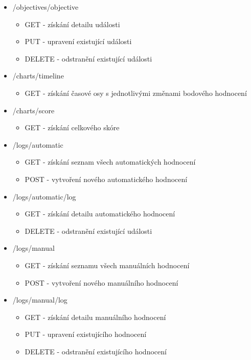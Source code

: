 \documentclass[
  digital, %
  twoside, %
  table,   %
  lof,     %
  lot,     %
]{fithesis3}
\begin{document}
\begin{itemize}
    \item /objectives/{objective}
    \begin{itemize}
        \item GET - získání detailu události
        \item PUT - upravení existující události
        \item DELETE - odstranění existující události
    \end{itemize}
        
    \item /charts/timeline
    \begin{itemize}
        \item GET - získání časové osy s jednotlivými změnami bodového hodnocení
    \end{itemize}
        
    \item /charts/score
    \begin{itemize}
        \item GET - získání celkového skóre
    \end{itemize}
        
    \item /logs/automatic
    \begin{itemize}
        \item GET - získání seznam všech automatických hodnocení
        \item POST -  vytvoření nového automatického hodnocení
    \end{itemize}
        
    \item /logs/automatic/{log}
    \begin{itemize}
        \item GET - získání detailu automatického hodnocení
        \item DELETE - odstranění existující události
    \end{itemize}
            
    \item /logs/manual
    \begin{itemize}
        \item GET - získání seznamu všech manuálních hodnocení
        \item POST -  vytvoření nového manuálního hodnocení
    \end{itemize}
            
    \item /logs/manual/{log}
    \begin{itemize}
        \item GET - získání detailu manuálního hodnocení
        \item PUT - upravení existujícího hodnocení
        \item DELETE - odstranění existujícího hodnocení
    \end{itemize}
            

\end{itemize}
\end{document}
